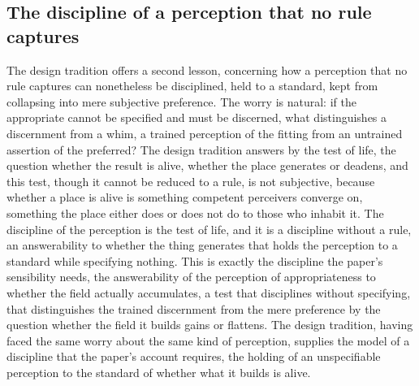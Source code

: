 \subsection{The discipline of a perception that no rule captures}
\label{p22:sub:alex-discipline}

The design tradition offers a second lesson, concerning how a perception that no rule captures can nonetheless be disciplined, held to a standard, kept from collapsing into mere subjective preference. The worry is natural: if the appropriate cannot be specified and must be discerned, what distinguishes a discernment from a whim, a trained perception of the fitting from an untrained assertion of the preferred? The design tradition answers by the test of life, the question whether the result is alive, whether the place generates or deadens, and this test, though it cannot be reduced to a rule, is not subjective, because whether a place is alive is something competent perceivers converge on, something the place either does or does not do to those who inhabit it. The discipline of the perception is the test of life, and it is a discipline without a rule, an answerability to whether the thing generates that holds the perception to a standard while specifying nothing. This is exactly the discipline the paper's sensibility needs, the answerability of the perception of appropriateness to whether the field actually accumulates, a test that disciplines without specifying, that distinguishes the trained discernment from the mere preference by the question whether the field it builds gains or flattens. The design tradition, having faced the same worry about the same kind of perception, supplies the model of a discipline that the paper's account requires, the holding of an unspecifiable perception to the standard of whether what it builds is alive.

